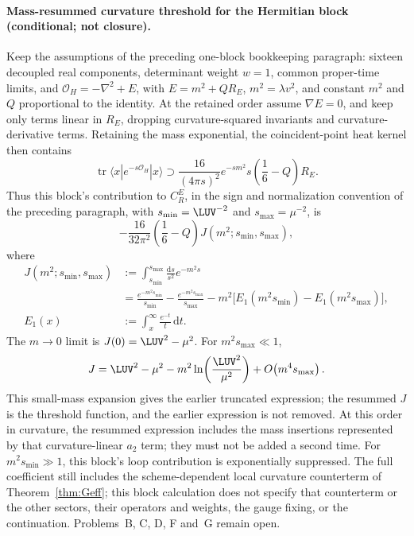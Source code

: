 \paragraph{Mass-resummed curvature threshold for the Hermitian block
(conditional; not closure).}
Keep the assumptions of the preceding one-block bookkeeping paragraph:
sixteen decoupled real components, determinant weight \(w=1\), common
proper-time limits, and
\(\mathcal O_H=-\nabla^2+E\), with
\(E=m^2+Q R_E\), \(m^2=\lambda v^2\), and constant \(m^2\) and \(Q\)
proportional to the identity. At the retained order assume
\(\nabla E=0\), and keep only terms linear in \(R_E\), dropping
curvature-squared invariants and curvature-derivative terms. Retaining
the mass exponential, the coincident-point heat kernel then contains
\[
\operatorname{tr}\langle x|e^{-s\mathcal O_H}|x\rangle
\supset
\frac{16}{(4\pi s)^2}e^{-sm^2}
s\left(\frac16-Q\right)R_E .
\]
Thus this block's contribution to \(C_R^E\), in the sign and
normalization convention of the preceding paragraph, with
\(s_{\min}=\LUV^{-2}\) and \(s_{\max}=\mu^{-2}\), is
\[
-\frac{16}{32\pi^2}\left(\frac16-Q\right)
J(m^2;s_{\min},s_{\max}),
\]
where
\[
\begin{aligned}
J(m^2;s_{\min},s_{\max})
&:=\int_{s_{\min}}^{s_{\max}}\frac{\mathrm{d}s}{s^2}e^{-m^2s}\\
&=\frac{e^{-m^2s_{\min}}}{s_{\min}}
 -\frac{e^{-m^2s_{\max}}}{s_{\max}}
 -m^2\bigl[
 E_1(m^2s_{\min})-E_1(m^2s_{\max})
 \bigr],
\\
E_1(x)
&:=\int_x^\infty\frac{e^{-t}}{t}\,\mathrm{d}t.
\end{aligned}
\]
The \(m\to0\) limit is \(J(0)=\LUV^2-\mu^2\). For
\(m^2s_{\max}\ll1\),
\[
J=\LUV^2-\mu^2
 -m^2\ln\!\left(\frac{\LUV^2}{\mu^2}\right)
 +O\!\left(m^4s_{\max}\right).
\]
This small-mass expansion gives the earlier truncated expression;
the resummed \(J\) is the threshold function, and the earlier
expression is not removed. At this order in curvature, the resummed
expression includes the mass insertions represented by that
curvature-linear \(a_2\) term; they must not be added a second time.
For \(m^2s_{\min}\gg1\), this block's loop contribution is
exponentially suppressed. The full coefficient still includes the
scheme-dependent local curvature counterterm of
Theorem~\ref{thm:Geff}; this block calculation does not specify that
counterterm or the other sectors, their operators and weights, the
gauge fixing, or the continuation. Problems~B, C, D, F and~G remain
open.
